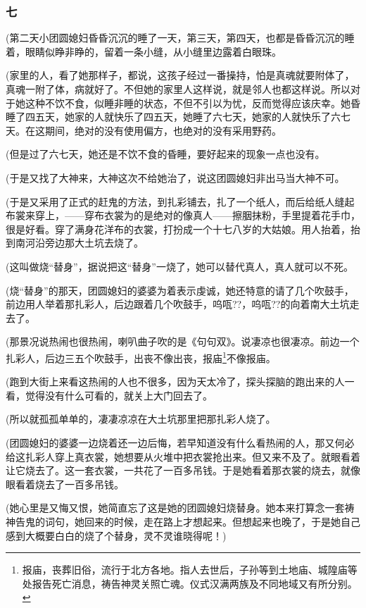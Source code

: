 \subsubsection*{七}
\par (第二天小团圆媳妇昏昏沉沉的睡了一天，第三天，第四天，也都是昏昏沉沉的睡着，眼睛似睁非睁的，留着一条小缝，从小缝里边露着白眼珠。
\par (家里的人，看了她那样子，都说，这孩子经过一番操持，怕是真魂就要附体了，真魂一附了体，病就好了。不但她的家里人这样说，就是邻人也都这样说。所以对于她这种不饮不食，似睡非睡的状态，不但不引以为忧，反而觉得应该庆幸。她昏睡了四五天，她家的人就快乐了四五天，她睡了六七天，她家的人就快乐了六七天。在这期间，绝对的没有使用偏方，也绝对的没有采用野药。
\par (但是过了六七天，她还是不饮不食的昏睡，要好起来的现象一点也没有。
\par (于是又找了大神来，大神这次不给她治了，说这团圆媳妇非出马当大神不可。
\par (于是又采用了正式的赶鬼的方法，到扎彩铺去，扎了一个纸人，而后给纸人缝起布裳来穿上，——穿布衣裳为的是绝对的像真人——擦胭抹粉，手里提着花手巾，很是好看。穿了满身花洋布的衣裳，打扮成一个十七八岁的大姑娘。用人抬着，抬到南河沿旁边那大土坑去烧了。
\par (这叫做烧“替身”，据说把这“替身”一烧了，她可以替代真人，真人就可以不死。
\par (烧“替身”的那天，团圆媳妇的婆婆为着表示虔诚，她还特意的请了几个吹鼓手，前边用人举着那扎彩人，后边跟着几个吹鼓手，呜咓??，呜咓??的向着南大土坑走去了。
\par (那景况说热闹也很热闹，喇叭曲子吹的是《句句双》。说凄凉也很凄凉。前边一个扎彩人，后边三五个吹鼓手，出丧不像出丧，报庙\footnote{报庙，丧葬旧俗，流行于北方各地。指人去世后，子孙等到土地庙、城隍庙等处报告死亡消息，祷告神灵关照亡魂。仪式汉满两族及不同地域又有所分别。}不像报庙。
\par (跑到大街上来看这热闹的人也不很多，因为天太冷了，探头探脑的跑出来的人一看，觉得没有什么可看的，就关上大门回去了。
\par (所以就孤孤单单的，凄凄凉凉在大土坑那里把那扎彩人烧了。
\par (团圆媳妇的婆婆一边烧着还一边后悔，若早知道没有什么看热闹的人，那又何必给这扎彩人穿上真衣裳，她想要从火堆中把衣裳抢出来。但又来不及了。就眼看着让它烧去了。这一套衣裳，一共花了一百多吊钱。于是她看着那衣裳的烧去，就像眼看着烧去了一百多吊钱。
\par (她心里是又悔又恨，她简直忘了这是她的团圆媳妇烧替身。她本来打算念一套祷神告鬼的词句，她回来的时候，走在路上才想起来。但想起来也晚了，于是她自己感到大概要白白的烧了个替身，灵不灵谁晓得呢！)
